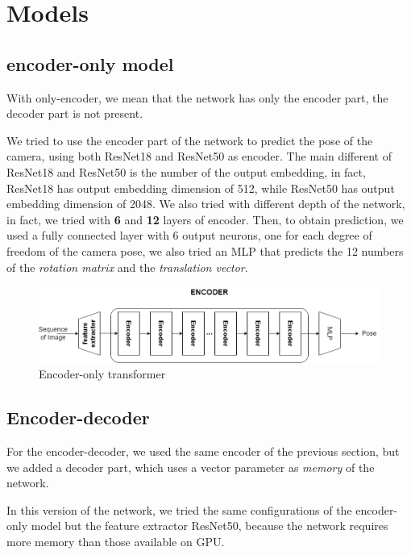 \section{Models}\label{sec:encoder}
\subsection{encoder-only model}\label{subsec:encoder-only-model}
With only-encoder, we mean that the network has only the encoder part, the decoder part is not present.

We tried to use the encoder part of the network to predict the pose of the camera, using both ResNet18 and ResNet50 as encoder.
The main different of ResNet18 and ResNet50 is the number of the output embedding, in fact, ResNet18 has output embedding dimension of 512, while ResNet50 has output embedding dimension of 2048.
We also tried with different depth of the network, in fact, we tried with \textbf{6} and \textbf{12} layers of encoder.
Then, to obtain prediction, we used a fully connected layer with 6 output neurons, one for each degree of freedom of the camera pose, we also tried an MLP that predicts the 12 numbers of the \textit{rotation matrix} and the \textit{translation vector}.

\begin{figure}[H]
    \centering
    \includegraphics[width=\textwidth]{images/4_encoder_only}
    \caption{Encoder-only transformer}\label{fig:figure-encoder-only-transformer}
\end{figure}

\subsection{Encoder-decoder}\label{subsec:encoder-decoder}

For the encoder-decoder, we used the same encoder of the previous section, but we added a decoder part, which uses a vector parameter as \textit{memory} of the network.

In this version of the network, we tried the same configurations of the encoder-only model but the feature extractor ResNet50, because the network requires more memory than those available on GPU.


